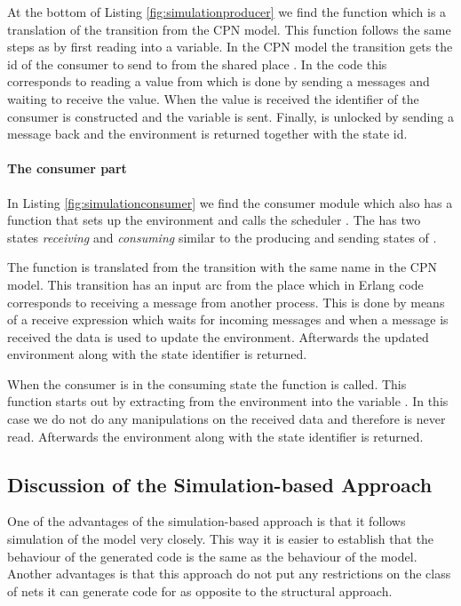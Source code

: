 At the bottom of Listing \ref{fig:simulationproducer} we find the function  which is a translation of the transition  from the CPN model. This function follows the same steps as  by first reading  into a variable. In the CPN model the transition  gets the id of the consumer to send to from the shared place . In the code this corresponds to reading a value from  which is done by sending a  messages and waiting to receive the value. When the value is received the identifier of the consumer is constructed and the variable  is sent. Finally,  is unlocked by sending a  message back and the environment is returned together with the state id.

\paragraph{The consumer part}

In Listing \ref{fig:simulationconsumer} we find the consumer module which also has a  function that sets up the environment and calls the scheduler . The  has two states \emph{receiving} and \emph{consuming} similar to the producing and sending states of .



The function  is translated from the transition with the same name in the CPN model. This transition has an input arc from the place  which in Erlang code corresponds to receiving a message from another process. This is done by means of a receive expression which waits for incoming messages and when a message is received the data is used to update the environment. Afterwards the updated environment along with the state identifier is returned.

When the consumer is in the consuming state the function  is called. This function starts out by extracting  from the environment into the variable . In this case we do not do any manipulations on the received data and therefore  is never read. Afterwards the environment along with the state identifier  is returned.

\subsection{Discussion of the Simulation-based Approach}
One of the advantages of the simulation-based approach is that it follows simulation of the model very closely. This way it is easier to establish that the behaviour of the generated code is the same as the behaviour of the model. Another advantages is that this approach do not put any restrictions on the class of nets it can generate code for as opposite to the structural approach.

